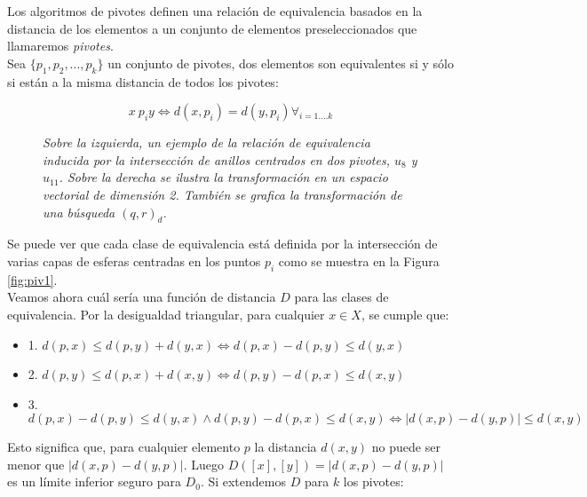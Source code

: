 Los algoritmos de pivotes definen una relaci\'on de equivalencia basados en la distancia de los elementos a un conjunto de elementos preseleccionados que llamaremos \textit{pivotes}.\\

Sea $\{p_1, p_2,...,p_k\}$ un conjunto de pivotes, dos elementos son equivalentes si y s\'olo si est\'an a la misma distancia de todos los pivotes:

\[
x ~ p_i  y \Leftrightarrow d(x,p_i) = d(y,p_i) \forall_{i = 1....k}
\]

\begin{figure}[htb]
\centerline{ %
   \vspace{.2in}
   }
   \caption [Relaci\'on de equivalencia inducida por dos pivotes y su
   correspondiente transformaci\'on en un espacio vectorial]
     {\textsl{\footnotesize{Sobre la izquierda, un ejemplo de la relaci\'on de equivalencia inducida
        por la intersecci\'on de anillos centrados en dos pivotes, $u_8$ y $u_{11}$.
        Sobre la derecha se ilustra la transformaci\'on en un espacio vectorial de dimensi\'on 2.
    	Tambi\'en se grafica la transformaci\'on de una b\'usqueda $(q,r)_d$. }}}
\label{piv1}
\end{figure} 

Se puede ver que cada clase de equivalencia est\'a definida por la intersecci\'on de varias capas de esferas centradas en los puntos $p_i$ como se muestra en la Figura \ref{fig:piv1}.\\

Veamos ahora cu\'al ser\'ia una funci\'on de distancia $D$ para las clases de equivalencia.  Por la desigualdad triangular, para cualquier $x \in X$, se cumple que:

\begin{itemize}
\item 1. $d(p,x) \leq d(p,y) + d(y,x) \Leftrightarrow d(p,x) - d(p,y) \leq d(y,x)$
\item 2. $d(p,y) \leq d(p,x) + d(x,y) \Leftrightarrow d(p,y) - d(p,x) \leq d(x,y)$
\item 3. $d(p,x) - d(p,y) \leq d(y,x) \wedge d(p,y) - d(p,x) \leq d(x,y) \Leftrightarrow |d(x,p) - d(y,p)| \leq d(x,y)$
\end{itemize}

Esto significa que, para cualquier elemento $p$ la distancia $d(x,y)$ no puede ser menor que $|d(x,p) - d(y,p)|$. Luego  $D([x],[y]) = |d(x,p) - d(y,p)|$  es un l\'imite inferior seguro para $D_0$. Si extendemos $D$ para $k$ los pivotes:

